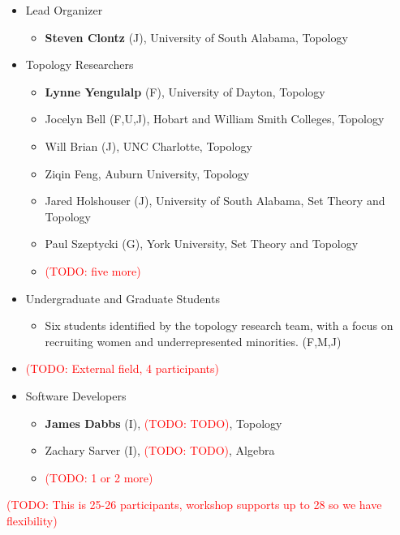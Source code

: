 \documentclass{amsart}
\newcommand{\TODO}[1]{\textcolor{red}{(TODO: #1)}}
\begin{document}
\begin{itemize}
    \item Lead Organizer
    \begin{itemize}
        \item \textbf{Steven Clontz} (J), University of South Alabama, Topology
    \end{itemize}
    \item Topology Researchers
    \begin{itemize}
        \item \textbf{Lynne Yengulalp} (F), University of Dayton, Topology
        \item Jocelyn Bell (F,U,J), Hobart and William Smith Colleges, Topology
        \item Will Brian (J), UNC Charlotte, Topology
        \item Ziqin Feng, Auburn University, Topology
        \item Jared Holshouser (J), University of South Alabama, Set Theory and Topology
        \item Paul Szeptycki (G), York University, Set Theory and Topology
        \item \TODO{five more} 
    \end{itemize}
    \item Undergraduate and Graduate Students
    \begin{itemize}
        \item Six students identified by the topology research team, with a
          focus on recruiting women and underrepresented minorities. (F,M,J)
    \end{itemize}
    \item \TODO{External field, 4 participants}
    \item Software Developers 
    \begin{itemize}
        \item \textbf{James Dabbs} (I), \TODO{TODO}, Topology
        \item Zachary Sarver (I), \TODO{TODO}, Algebra
        \item \TODO{1 or 2 more}
    \end{itemize}
\end{itemize}

\TODO{This is 25-26 participants, workshop supports up to 28 so we have flexibility}

{}

\end{document}
